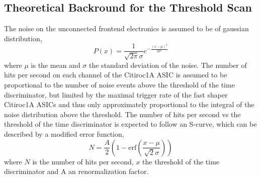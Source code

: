 \subsection{Theoretical Backround for the Threshold Scan} \label{sec:noise_theory}
The noise on the unconnected frontend electronics is assumed to be of gaussian distribution,
\begin{equation}
    P(x) = \frac{1}{\sqrt{2\pi}\sigma}e^{-\frac{(x-\mu)^2}{2\sigma^2}}
\end{equation}
where $\mu$ is the mean and $\sigma$ the standard deviation of the noise.\autocite{Theorynoise}
\newline
The number of hits per second on each channel of the Citiroc1A ASIC is assumed to be proportional to the number of noise events above the threshold of the time discriminator, but limited by the maximal trigger rate of the fast shaper Citiroc1A ASICs
and thus only approximately proportional to the integral of the noise distribution above the threshold.\autocite{Theorynoise}
\newline
The number of hits per second vs the threshold of the time discriminator is expected to follow an S-curve, which can be described by a modified error function,
\begin{equation}
    N = \frac{A}{2} \left( 1 - \text{erf} \left( \frac{x - \mu}{\sqrt{2}\sigma} \right) \right)
\end{equation}
where $N$ is the number of hits per second, $x$ the threshold of the time discriminator and A an renormalization factor.\autocite{Theorynoise}